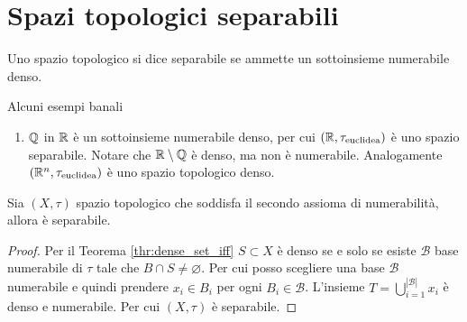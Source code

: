 \section{Spazi topologici separabili}

\begin{definition}
	Uno spazio topologico si dice separabile se ammette un sottoinsieme numerabile denso.
\end{definition}

Alcuni esempi banali
\begin{enumerate}
	\item $\mathbb{Q}$ in $\mathbb{R}$ è un sottoinsieme numerabile denso, per cui $(\mathbb{R}, \tau_{\text{euclidea}})$ è uno spazio separabile. Notare che $\mathbb{R} \setminus \mathbb{Q}$ è denso, ma non è numerabile. Analogamente $(\mathbb{R}^n, \tau_{\text{euclidea}})$ è uno spazio topologico denso.
\end{enumerate}

\begin{theorem}
	Sia $(X, \tau)$ spazio topologico che soddisfa il secondo assioma di numerabilità, allora è separabile.	
\end{theorem}
\begin{proof}
	Per il Teorema \ref{thr:dense_set_iff} $S \subset X$ è denso se e solo se esiste $\mathcal{B}$ base numerabile di $\tau$ tale che $B \cap S \neq \varnothing$. Per cui posso scegliere una base $\mathcal{B}$ numerabile e quindi prendere $x_i \in B_i$ per ogni $B_i \in \mathcal{B}$. L'insieme $T = \bigcup^{|\mathcal{B}|}_{i=1} x_i$ è denso e numerabile. Per cui $(X, \tau)$ è separabile.
\end{proof}

